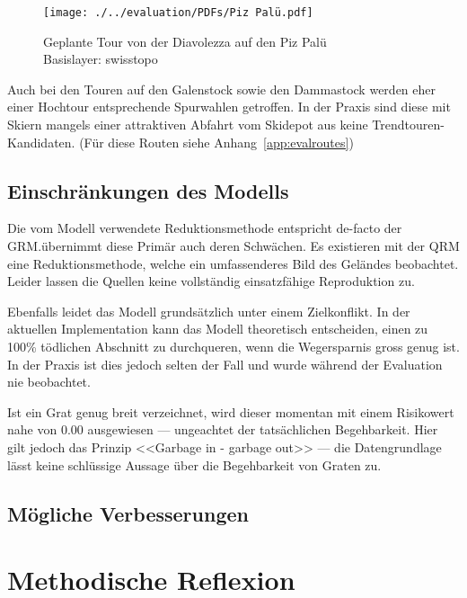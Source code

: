 \begin{figure}[h]
  \centering
  \texttt{[image: ./../evaluation/PDFs/Piz Palü.pdf]}
  \caption{Geplante Tour von der Diavolezza auf den Piz Palü\\Basislayer: swisstopo}\label{fig:pizpalu}
\end{figure}

Auch bei den Touren auf den Galenstock sowie den Dammastock werden eher einer Hochtour entsprechende Spurwahlen getroffen. In der Praxis sind diese mit Skiern mangels einer attraktiven Abfahrt vom Skidepot aus keine Trendtouren-Kandidaten. (Für diese Routen siehe Anhang\ \ref{app:evalroutes})

\clearpage

\subsection{Einschränkungen des Modells}
Die vom Modell verwendete Reduktionsmethode entspricht de-facto der GRM.\@So übernimmt diese Primär auch deren Schwächen. Es existieren mit der QRM eine Reduktionsmethode, welche ein umfassenderes Bild des Geländes beobachtet.\cite{qrm}
Leider lassen die Quellen keine vollständig einsatzfähige Reproduktion zu.

Ebenfalls leidet das Modell grundsätzlich unter einem Zielkonflikt. In der aktuellen Implementation kann das Modell theoretisch entscheiden, einen zu 100\% tödlichen Abschnitt zu durchqueren, wenn die Wegersparnis gross genug ist. In der Praxis ist dies jedoch selten der Fall und wurde während der Evaluation nie beobachtet.

Ist ein Grat genug breit verzeichnet, wird dieser momentan mit einem Risikowert nahe von $0.00$ ausgewiesen --- ungeachtet der tatsächlichen Begehbarkeit. Hier gilt jedoch das Prinzip <<Garbage in - garbage out>> --- die Datengrundlage lässt keine schlüssige Aussage über die Begehbarkeit von Graten zu.

\subsection{Mögliche Verbesserungen}


\clearpage
\section{Methodische Reflexion}
